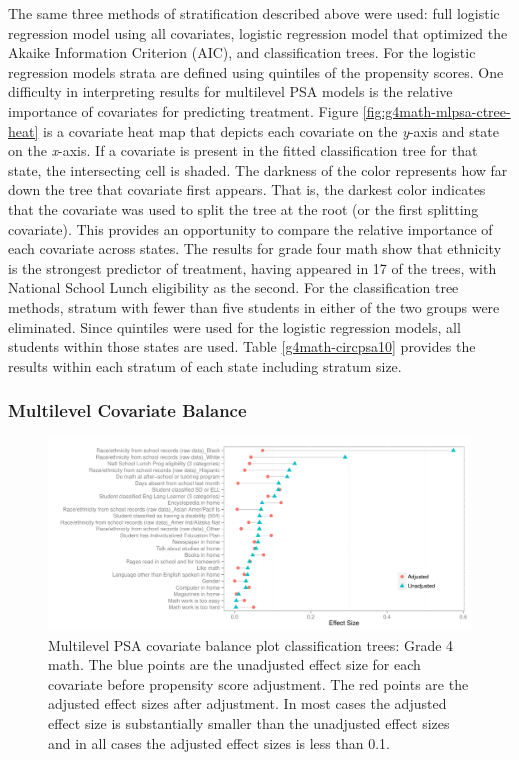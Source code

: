 \documentclass[letterpaper,12p,twoside]{article} %
\begin{document}
The same three methods of stratification described above were used: full logistic regression model using all covariates, logistic regression model that optimized the Akaike Information Criterion (AIC), and classification trees. For the logistic regression models strata are defined using quintiles of the propensity scores. One difficulty in interpreting results for multilevel PSA models is the relative importance of covariates for predicting treatment. Figure \ref{fig:g4math-mlpsa-ctree-heat} is a covariate heat map that depicts each covariate on the \textit{y}-axis and state on the \textit{x}-axis. If a covariate is present in the fitted classification tree for that state, the intersecting cell is shaded. The darkness of the color represents how far down the tree that covariate first appears. That is, the darkest color indicates that the covariate was used to split the tree at the root (or the first splitting covariate). This provides an opportunity to compare the relative importance of each covariate across states. The results for grade four math show that ethnicity is the strongest predictor of treatment, having appeared in 17 of the trees, with National School Lunch eligibility as the second. For the classification tree methods, stratum with fewer than five students in either of the two groups were eliminated. Since quintiles were used for the logistic regression models, all students within those states are used. Table \ref{g4math-circpsa10} provides the results within each stratum of each state including stratum size.

\subsubsection{Multilevel Covariate Balance}

\setlength{\belowcaptionskip}{-10pt}
\begin{figure}[t]
\begin{center}
\includegraphics[width=\textwidth, trim=0 .2in 0 .1in]{../Figures2009/g4math-mlpsa-ctree-balance.pdf}
\caption[Multilevel PSA covariate balance plot classification trees: Grade 4 math]{Multilevel PSA covariate balance plot classification trees: Grade 4 math. The blue points are the unadjusted effect size for each covariate before propensity score adjustment. The red points are the adjusted effect sizes after adjustment. In most cases the adjusted effect size is substantially smaller than the unadjusted effect sizes and in all cases the adjusted effect sizes is less than 0.1.}
\label{fig:g4math-mlpsa-ctree-balance}
\end{center}
\end{figure}
\setlength{\belowcaptionskip}{0pt}
\end{document}
